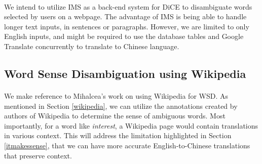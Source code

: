 \documentclass[12 pt]{article}
\begin{document}
\paragraph{}
We intend to utilize IMS as a back-end system for DiCE to disambiguate words selected by users on a webpage. The advantage of IMS is being able to handle longer text inputs, in sentences or paragraphs. However, we are limited to only English inputs, and might be required to use the database tables and Google Translate concurrently to translate to Chinese language.

\subsection{Word Sense Disambiguation using Wikipedia}
\paragraph{}
We make reference to Mihalcea's work \cite{wikipedia} on using Wikipedia for WSD. As mentioned in Section \ref{wikipedia}, we can utilize the annotations created by authors of Wikipedia to determine the sense of ambiguous words. Most importantly, for a word like \textit{interest}, a Wikipedia page would contain translations in various context. This will address the limitation highlighted in Section \ref{itmakessense}, that we can have more accurate English-to-Chinese translations that preserve context.

\end{document}
